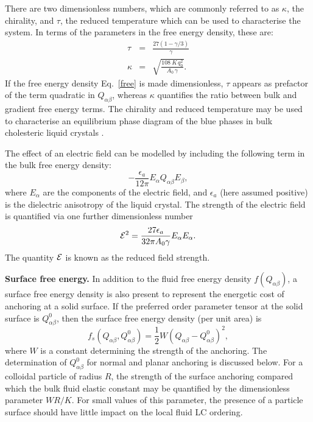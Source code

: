 \documentclass[12pt]{article}
\begin{document}
There are two dimensionless numbers, which are commonly referred to as
$\kappa$, the chirality, and  $\tau$, the reduced temperature
\cite{mermin} which can be used to characterise the system. In terms of
the parameters in the free energy density, these are:
\begin{eqnarray}\label{cntrl-param} 
\tau&=&\frac{27(1-\gamma/3)}{\gamma}\label{tau}\\
\kappa&=&\sqrt{\frac{108\ K\, q_0^2}{A_0\, \gamma}}\label{kappa}.
\end{eqnarray}
If the free energy density Eq.~\ref{free} is made dimensionless, $\tau$
appears as prefactor of the term  quadratic in $Q_{\alpha\beta}$,
whereas $\kappa$
quantifies the ratio between bulk and  gradient free energy terms. The
chirality and reduced temperature may be used to characterise an equilibrium
phase diagram of the blue phases in bulk cholesteric liquid crystals
\cite{mermin,henrichfield}.

The effect of an electric field can be modelled by including the following
term in the bulk free energy density:
\begin{equation}
-\frac{\epsilon_a}{12\pi} E_{\alpha}Q_{\alpha\beta}E_{\beta},
\end{equation} 
where $E_{\alpha}$ are the components of the electric field, and 
$\epsilon_a$ (here assumed positive) is the dielectric anisotropy of the liquid
crystal. The strength of the electric field is quantified via
one further dimensionless number
\begin{equation}
{\cal E}^2 = \frac{27 \epsilon_a}{32 \pi A_0 \gamma} E_\alpha E_\alpha.
\end{equation}
The quantity ${\cal E}$ is known as the reduced field strength.


\medskip
\noindent
\textbf{Surface free energy.}
In addition to the fluid free energy density $f(Q_{\alpha\beta})$, a surface
free energy density is also present to represent the energetic cost of
anchoring at a solid surface. If the preferred order parameter tensor
at the solid surface is $Q^0_{\alpha\beta}$, then the surface free energy
density (per unit area) is
\begin{equation}
f_s(Q_{\alpha\beta}, Q^0_{\alpha\beta})
= {\textstyle \frac{1}{2}}W(Q_{\alpha\beta} - Q^0_{\alpha\beta})^2,
\end{equation}
where $W$ is a constant determining the strength of the anchoring.
The determination of $Q^0_{\alpha\beta}$ for normal and planar anchoring is
discussed below. For a colloidal particle of radius $R$, the strength of
the surface
anchoring compared which the bulk fluid elastic constant may be quantified
by the dimensionless parameter $WR/K$. For small values of this parameter,
the presence of a particle surface should have little impact on the local
fluid LC ordering.
\end{document}
